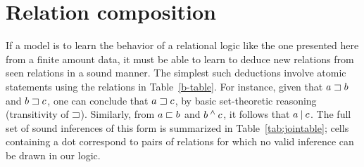 \section{Relation composition}\label{sec:join}

If a model is to learn the behavior of a relational logic like the one
presented here from a finite amount data, it must be able to learn to
deduce new relations from seen relations in a sound
manner. The simplest such deductions involve atomic statements using
the relations in Table~\ref{b-table}. For instance, given that $a
\sqsupset b$ and $b \sqsupset c$, one can conclude that $a \sqsupset c$, by
basic set-theoretic reasoning (transitivity of $\sqsupset$). Similarly,
from $a \sqsubset b$ and $b \mathbin{^{\wedge}} c$, it follows that $a \mathbin{|} c$.
The full set of sound inferences of this form is summarized in
Table~\ref{tab:jointable}; cells containing a dot correspond to pairs
of relations for which no valid inference can be drawn in our logic.


